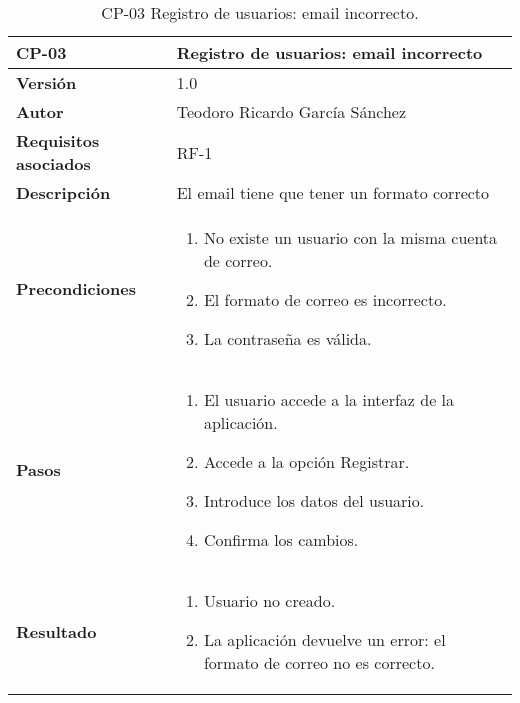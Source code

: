 \begin{table}[p]
	\centering
	\begin{tabularx}{\linewidth}{ p{} p{} }
		\toprule
		\textbf{CP-03}    & \textbf{Registro de usuarios: email incorrecto}\\
		\toprule
		\textbf{Versión}              & 1.0    \\
		\textbf{Autor}                & Teodoro Ricardo García Sánchez \\
		\textbf{Requisitos asociados} & RF-1 \\
		\textbf{Descripción}          & El email tiene que tener un formato correcto\\
		\textbf{Precondiciones}       &  
		\begin{enumerate}
			\def\labelenumi{\arabic{enumi}.}
			\tightlist
			\item No existe un usuario con la misma cuenta de correo.
			\item El formato de correo es incorrecto.
			\item La contraseña es válida.
		\end{enumerate}\\
		\textbf{Pasos}             &
		\begin{enumerate}
			\def\labelenumi{\arabic{enumi}.}
			\tightlist
			\item El usuario accede a la interfaz de la aplicación.
			\item Accede a la opción Registrar.
			\item Introduce los datos del usuario.
			\item Confirma los cambios.
		\end{enumerate}\\
		\textbf{Resultado}          & 
		\begin{enumerate}
			\item Usuario no creado.
			\item La aplicación devuelve un error: el formato de correo no es correcto.
		\end{enumerate}\\
		\bottomrule
	\end{tabularx}
	\caption{CP-03 Registro de usuarios: email incorrecto.}
\end{table}

